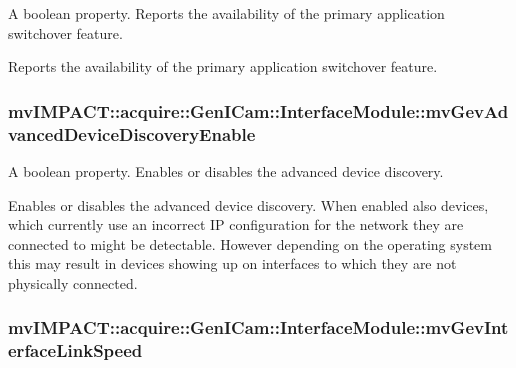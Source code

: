 A boolean property. Reports the availability of the primary application switchover feature. 

Reports the availability of the primary application switchover feature. \hypertarget{classmv_i_m_p_a_c_t_1_1acquire_1_1_gen_i_cam_1_1_interface_module_a39377c773b525daf0d8bb65b42ce3fba}{
\subsubsection[{mv\+Gev\+Advanced\+Device\+Discovery\+Enable}]{ mv\+I\+M\+P\+A\+C\+T\+::acquire\+::\+Gen\+I\+Cam\+::\+Interface\+Module\+::mv\+Gev\+Advanced\+Device\+Discovery\+Enable}}\label{classmv_i_m_p_a_c_t_1_1acquire_1_1_gen_i_cam_1_1_interface_module_a39377c773b525daf0d8bb65b42ce3fba}


A boolean property. Enables or disables the advanced device discovery. 

Enables or disables the advanced device discovery. When enabled also devices, which currently use an incorrect I\+P configuration for the network they are connected to might be detectable. However depending on the operating system this may result in devices showing up on interfaces to which they are not physically connected. \hypertarget{classmv_i_m_p_a_c_t_1_1acquire_1_1_gen_i_cam_1_1_interface_module_a2bcce0f05c0e58b30d670d9201b3fb6e}{
\subsubsection[{mv\+Gev\+Interface\+Link\+Speed}]{ mv\+I\+M\+P\+A\+C\+T\+::acquire\+::\+Gen\+I\+Cam\+::\+Interface\+Module\+::mv\+Gev\+Interface\+Link\+Speed}}\label{classmv_i_m_p_a_c_t_1_1acquire_1_1_gen_i_cam_1_1_interface_module_a2bcce0f05c0e58b30d670d9201b3fb6e}


